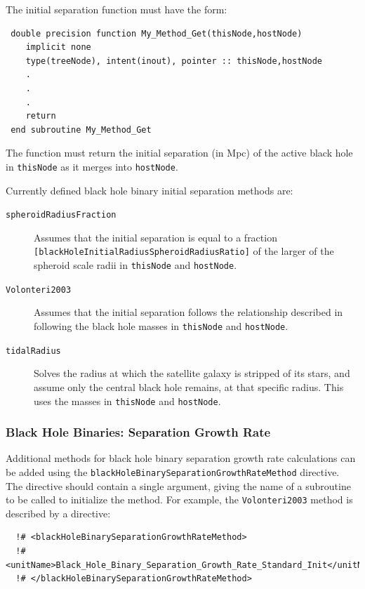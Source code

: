 The initial separation function must have the form:
\begin{verbatim}
 double precision function My_Method_Get(thisNode,hostNode)
    implicit none
    type(treeNode), intent(inout), pointer :: thisNode,hostNode
    .
    .
    .
    return
 end subroutine My_Method_Get
\end{verbatim}
The function must return the initial separation (in Mpc) of the active black hole in {\tt thisNode} as it merges into {\tt hostNode}.

Currently defined black hole binary initial separation methods are:
\begin{description}
 \item [{\tt spheroidRadiusFraction}] Assumes that the initial separation is equal to a fraction {\tt [blackHoleInitialRadiusSpheroidRadiusRatio]} of the larger of the spheroid scale radii in {\tt thisNode} and {\tt hostNode}.
 \item [{\tt Volonteri2003}] Assumes that the initial separation follows the relationship described in \cite{volonteri_assembly_2003} following the black hole masses in {\tt thisNode} and {\tt hostNode}.
\item [{\tt tidalRadius}] Solves the radius at which the satellite galaxy is stripped of its stars, and assume only the central black hole remains, at that specific radius. This uses the masses in {\tt thisNode} and {\tt hostNode}.
\end{description}

\subsubsection{Black Hole Binaries: Separation Growth Rate}\label{sec:SMBHRadialMotion}

Additional methods for black hole binary separation growth rate calculations can be added using the {\tt blackHoleBinarySeparationGrowthRateMethod} directive. The directive should contain a single argument, giving the name of a subroutine to be called to initialize the method. For example, the {\tt Volonteri2003} method is described by a directive:

\begin{verbatim}
  !# <blackHoleBinarySeparationGrowthRateMethod>
  !#  <unitName>Black_Hole_Binary_Separation_Growth_Rate_Standard_Init</unitName>
  !# </blackHoleBinarySeparationGrowthRateMethod>
\end{verbatim}

